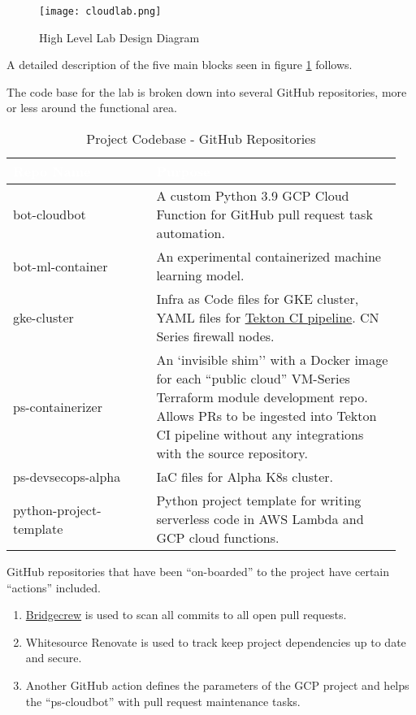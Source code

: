 \begin{figure}[ht]
  \texttt{[image: cloudlab.png]}
  \caption{High Level Lab Design Diagram}
  \label{design}
\end{figure}

\justifying
A detailed description of the five main blocks seen in figure \ref{design} follows.

\newpage
{}

\justifying
The code base for the lab is broken down into several GitHub repositories, more or less around the functional area. 

\begin{table}[ht]
    \centering
	\begin{tabular}{| p{0.35\linewidth} | p{0.6\linewidth} |} \hline
		\cellcolor{myblue}\textcolor{white}{Repo Name} & \cellcolor{myblue}\textcolor{white}{Purpose} \\\hline
		bot-cloudbot     & A custom Python 3.9 GCP Cloud Function for GitHub pull request task automation.\\\hline
		bot-ml-container & An experimental containerized machine learning model.\\\hline
		gke-cluster      & Infra as Code files for GKE cluster, YAML files for \href{https://tekton.dev/}{Tekton CI pipeline}. CN Series firewall nodes.\\\hline
		ps-containerizer & An `invisible shim'' with a Docker image for each ``public cloud'' VM-Series Terraform module development repo. Allows PRs to be
		ingested into Tekton CI pipeline without any integrations with the source repository.\\\hline
		ps-devsecops-alpha & IaC files for Alpha K8s cluster.\\\hline
		python-project-template & Python project template for writing serverless code in AWS Lambda and GCP cloud functions.\\\hline
	\end{tabular}
	\caption{Project Codebase - GitHub Repositories}
    \label{mytable:1}
\end{table}
\vspace{2mm}
\vspace{2mm}

\justifying
GitHub repositories that have been ``on-boarded'' to the project have certain ``actions'' included.

\begin{raggedright}
	\begin{enumerate}
        \item \href{https://docs.bridgecrew.io/docs}{Bridgecrew} is used to scan all commits to all open pull requests.
        \item Whitesource Renovate is used to track keep project dependencies up to date and secure.
        \item Another GitHub action defines the parameters of the GCP project and helps the ``ps-cloudbot'' with pull request  maintenance tasks.
	\end{enumerate}
\end{raggedright}
\vspace{2mm}


